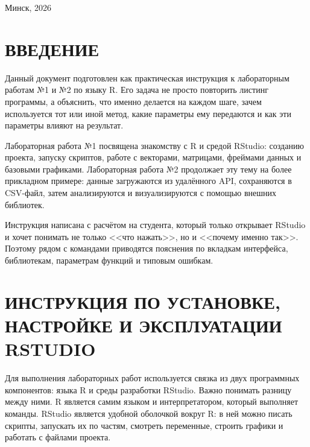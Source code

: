 \documentclass[14pt,a4paper]{extarticle}
\begin{document}
\vfill

\begin{center}
Минск, 2026
\end{center}

\newpage

\tableofcontents
\newpage

\section*{ВВЕДЕНИЕ}

Данный документ подготовлен как практическая инструкция к лабораторным работам №1 и №2 по языку R. Его задача не просто повторить листинг программы, а объяснить, что именно делается на каждом шаге, зачем используется тот или иной метод, какие параметры ему передаются и как эти параметры влияют на результат.

Лабораторная работа №1 посвящена знакомству с R и средой RStudio: созданию проекта, запуску скриптов, работе с векторами, матрицами, фреймами данных и базовыми графиками. Лабораторная работа №2 продолжает эту тему на более прикладном примере: данные загружаются из удалённого API, сохраняются в CSV-файл, затем анализируются и визуализируются с помощью внешних библиотек.

Инструкция написана с расчётом на студента, который только открывает RStudio и хочет понимать не только <<что нажать>>, но и <<почему именно так>>. Поэтому рядом с командами приводятся пояснения по вкладкам интерфейса, библиотекам, параметрам функций и типовым ошибкам.

\newpage

\section{ИНСТРУКЦИЯ ПО УСТАНОВКЕ, НАСТРОЙКЕ И ЭКСПЛУАТАЦИИ RSTUDIO}

Для выполнения лабораторных работ используется связка из двух программных компонентов: языка R и среды разработки RStudio. Важно понимать разницу между ними. R является самим языком и интерпретатором, который выполняет команды. RStudio является удобной оболочкой вокруг R: в ней можно писать скрипты, запускать их по частям, смотреть переменные, строить графики и работать с файлами проекта.
\end{document}
